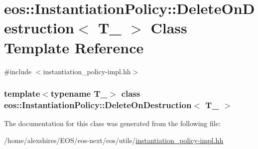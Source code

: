 \hypertarget{classeos_1_1InstantiationPolicy_1_1DeleteOnDestruction}{
\section{eos::InstantiationPolicy::DeleteOnDestruction$<$ T\_\- $>$ Class Template Reference}
\label{classeos_1_1InstantiationPolicy_1_1DeleteOnDestruction}
}


{\ttfamily \#include $<$instantiation\_\-policy-\/impl.hh$>$}\subsubsection*{template$<$typename T\_\-$>$ class eos::InstantiationPolicy::DeleteOnDestruction$<$ T\_\- $>$}



The documentation for this class was generated from the following file:\begin{DoxyCompactItemize}
\item 
/home/alexshires/EOS/eos-\/next/eos/utils/\hyperlink{instantiation__policy-impl_8hh}{instantiation\_\-policy-\/impl.hh}\end{DoxyCompactItemize}
